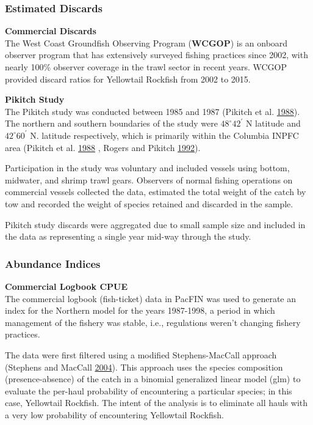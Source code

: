 \documentclass[12pt,]{article}
\begin{document}
\subsubsection{Estimated Discards}\label{estimated-discards}

\textbf{Commercial Discards}\\
The West Coast Groundfish Observing Program (\textbf{WCGOP}) is an
onboard observer program that has extensively surveyed fishing practices
since 2002, with nearly 100\% observer coverage in the trawl sector in
recent years. WCGOP provided discard ratios for Yellowtail Rockfish from
2002 to 2015.

\textbf{Pikitch Study}\\
The Pikitch study was conducted between 1985 and 1987 (Pikitch et al.
\protect\hyperlink{ref-Pikitch1988}{1988}). The northern and southern
boundaries of the study were \(48^\circ 42^\prime\) N latitude and
\(42^\circ 60^\prime\) N. latitude respectively, which is primarily
within the Columbia INPFC area (Pikitch et al.
\protect\hyperlink{ref-Pikitch1988}{1988} , Rogers and Pikitch
\protect\hyperlink{ref-Rogers1992}{1992}).

Participation in the study was voluntary and included vessels using
bottom, midwater, and shrimp trawl gears. Observers of normal fishing
operations on commercial vessels collected the data, estimated the total
weight of the catch by tow and recorded the weight of species retained
and discarded in the sample.

Pikitch study discards were aggregated due to small sample size and
included in the data as representing a single year mid-way through the
study.

\subsubsection{\texorpdfstring{Abundance Indices
\label{abundance-indices}}{Abundance Indices }}\label{abundance-indices}

\textbf{Commercial Logbook CPUE}\\
The commercial logbook (fish-ticket) data in PacFIN was used to generate
an index for the Northern model for the years 1987-1998, a period in
which management of the fishery was stable, i.e., regulations weren't
changing fishery practices.

The data were first filtered using a modified Stephens-MacCall approach
(Stephens and MacCall \protect\hyperlink{ref-Stephens2004}{2004}). This
approach uses the species composition (presence-absence) of the catch in
a binomial generalized linear model (glm) to evaluate the per-haul
probability of encountering a particular species; in this case,
Yellowtail Rockfish. The intent of the analysis is to eliminate all
hauls with a very low probability of encountering Yellowtail Rockfish.
\end{document}
